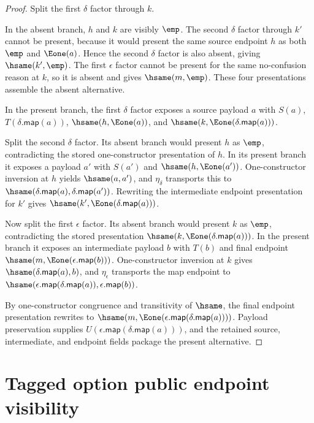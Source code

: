 \begin{proof}
Split the first $\delta$ factor through $k$.

In the absent branch, $h$ and $k$ are visibly $\emp$. The second $\delta$ factor
through $k'$ cannot be present, because it would present the same source
endpoint $h$ as both $\emp$ and $\Eone(a)$. Hence the second $\delta$ factor is
also absent, giving $\hsame(k',\emp)$. The first $\epsilon$ factor cannot be
present for the same no-confusion reason at $k$, so it is absent and gives
$\hsame(m,\emp)$. These four presentations assemble the absent alternative.

In the present branch, the first $\delta$ factor exposes a source payload $a$
with $S(a)$, $T(\delta.\mathsf{map}(a))$,
$\hsame(h,\Eone(a))$, and
$\hsame(k,\Eone(\delta.\mathsf{map}(a)))$.

Split the second $\delta$ factor. Its absent branch would present $h$ as
$\emp$, contradicting the stored one-constructor presentation of $h$. In its
present branch it exposes a payload $a'$ with $S(a')$ and
$\hsame(h,\Eone(a'))$. One-constructor inversion at $h$ yields
$\hsame(a,a')$, and $\eta_{\delta}$ transports this to
$\hsame(\delta.\mathsf{map}(a),\delta.\mathsf{map}(a'))$. Rewriting the
intermediate endpoint presentation for $k'$ gives
$\hsame(k',\Eone(\delta.\mathsf{map}(a)))$.

Now split the first $\epsilon$ factor. Its absent branch would present $k$ as
$\emp$, contradicting the stored presentation
$\hsame(k,\Eone(\delta.\mathsf{map}(a)))$. In the present branch it exposes an
intermediate payload $b$ with $T(b)$ and final endpoint
$\hsame(m,\Eone(\epsilon.\mathsf{map}(b)))$. One-constructor inversion at $k$
gives $\hsame(\delta.\mathsf{map}(a),b)$, and $\eta_{\epsilon}$ transports the
map endpoint to
$\hsame(\epsilon.\mathsf{map}(\delta.\mathsf{map}(a)),
\epsilon.\mathsf{map}(b))$.

By one-constructor congruence and transitivity of $\hsame$, the final endpoint
presentation rewrites to
$\hsame(m,\Eone(\epsilon.\mathsf{map}(\delta.\mathsf{map}(a))))$. Payload
preservation supplies
$U(\epsilon.\mathsf{map}(\delta.\mathsf{map}(a)))$, and the retained source,
intermediate, and endpoint fields package the present alternative.
\end{proof}

\section{Tagged option public endpoint visibility}
\label{sec:option-public-endpoint-visibility}

